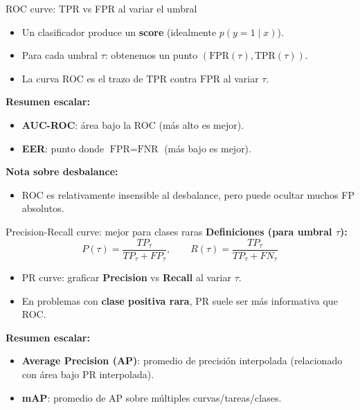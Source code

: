 \begin{frame}{ROC curve: TPR vs FPR al variar el umbral}
\begin{itemize}
  \item Un clasificador produce un \textbf{score} (idealmente \(p(y=1\mid x)\)).
  \item Para cada umbral \(\tau\): obtenemos un punto \((\text{FPR}(\tau),\text{TPR}(\tau))\).
  \item La curva ROC es el trazo de \(\text{TPR}\) contra \(\text{FPR}\) al variar \(\tau\).
\end{itemize}

\vspace{0.4em}
\textbf{Resumen escalar:}
\begin{itemize}
  \item \textbf{AUC-ROC}: área bajo la ROC (más alto es mejor).
  \item \textbf{EER}: punto donde \(\text{FPR}=\text{FNR}\) (más bajo es mejor).
\end{itemize}

\vspace{0.4em}
\textbf{Nota sobre desbalance:}
\begin{itemize}
  \item ROC es relativamente insensible al desbalance, pero puede ocultar muchos FP absolutos.
\end{itemize}
\end{frame}

\begin{frame}{Precision-Recall curve: mejor para clases raras}
\textbf{Definiciones (para umbral \(\tau\)):}
\[
P(\tau)=\frac{TP_\tau}{TP_\tau+FP_\tau},\qquad
R(\tau)=\frac{TP_\tau}{TP_\tau+FN_\tau}
\]

\begin{itemize}
  \item PR curve: graficar \textbf{Precision} vs \textbf{Recall} al variar \(\tau\).
  \item En problemas con \textbf{clase positiva rara}, PR suele ser más informativa que ROC.
\end{itemize}

\vspace{0.4em}
\textbf{Resumen escalar:}
\begin{itemize}
  \item \textbf{Average Precision (AP)}: promedio de precisión interpolada (relacionado con área bajo PR interpolada).
  \item \textbf{mAP}: promedio de AP sobre múltiples curvas/tareas/clases.
\end{itemize}
\end{frame}

